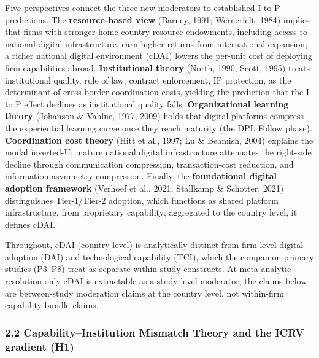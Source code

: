 \documentclass[
  12pt,a4paper]{article}
\begin{document}
Five perspectives connect the three new moderators to established I to P
predictions. The \textbf{resource-based view} (Barney, 1991; Wernerfelt,
1984) implies that firms with stronger home-country resource endowments,
including access to national digital infrastructure, earn higher returns
from international expansion; a richer national digital environment
(cDAI) lowers the per-unit cost of deploying firm capabilities abroad.
\textbf{Institutional theory} (North, 1990; Scott, 1995) treats
institutional quality, rule of law, contract enforcement, IP protection,
as the determinant of cross-border coordination costs, yielding the
prediction that the I to P effect declines as institutional quality
falls. \textbf{Organizational learning theory} (Johanson \& Vahlne,
1977, 2009) holds that digital platforms compress the experiential
learning curve once they reach maturity (the DPL Follow phase).
\textbf{Coordination cost theory} (Hitt et al., 1997; Lu \& Beamish,
2004) explains the modal inverted-U; mature national digital
infrastructure attenuates the right-side decline through communication
compression, transaction-cost reduction, and information-asymmetry
compression. Finally, the \textbf{foundational digital adoption
framework} (Verhoef et al., 2021; Stallkamp \& Schotter, 2021)
distinguishes Tier-1/Tier-2 adoption, which functions as shared platform
infrastructure, from proprietary capability; aggregated to the country
level, it defines cDAI.

Throughout, cDAI (country-level) is analytically distinct from
firm-level digital adoption (DAI) and technological capability (TCI),
which the companion primary studies (P3--P8) treat as separate
within-study constructs. At meta-analytic resolution only cDAI is
extractable as a study-level moderator; the claims below are
between-study moderation claims at the country level, not within-firm
capability-bundle claims.

\hypertarget{capabilityinstitution-mismatch-theory-and-the-icrv-gradient-h1}{%
\subsubsection{2.2 Capability--Institution Mismatch Theory and the ICRV
gradient
(H1)}\label{capabilityinstitution-mismatch-theory-and-the-icrv-gradient-h1}}
\end{document}
